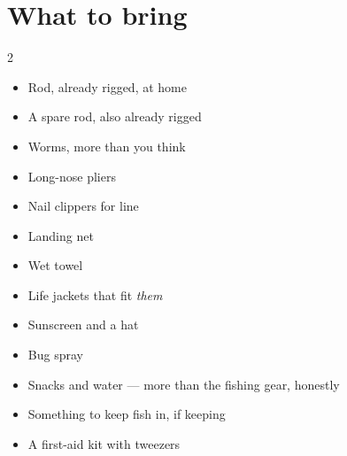 \section{What to bring}
\begin{multicols}{2}
\begin{itemize}[leftmargin=1.1em,itemsep=0.08em]
\item Rod, already rigged, at home
\item A spare rod, also already rigged
\item Worms, more than you think
\item Long-nose pliers
\item Nail clippers for line
\item Landing net
\item Wet towel
\item Life jackets that fit \emph{them}
\item Sunscreen and a hat
\item Bug spray
\item Snacks and water --- more than the fishing gear, honestly
\item Something to keep fish in, if keeping
\item A first-aid kit with tweezers
\end{itemize}
\end{multicols}

